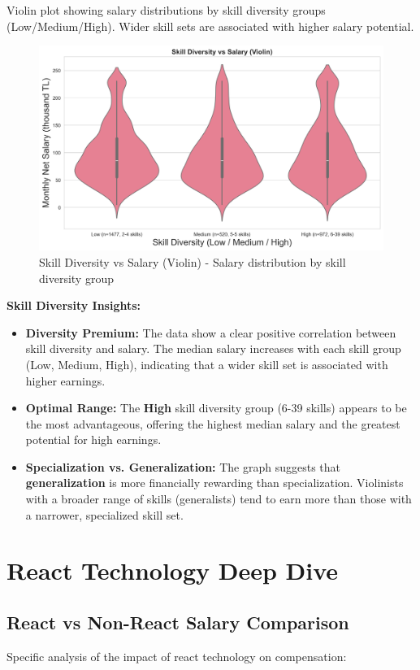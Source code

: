 \documentclass[12pt,a4paper]{article}
\begin{document}
Violin plot showing salary distributions by skill diversity groups (Low/Medium/High). Wider skill sets are associated with higher salary potential.

\begin{figure}[H]
    \centering
    \includegraphics[width=\textwidth]{figures/violin_skill_diversity.png}
    \caption{Skill Diversity vs Salary (Violin) - Salary distribution by skill diversity group}
\end{figure}

\textbf{Skill Diversity Insights:}
\begin{itemize}
    \item \textbf{Diversity Premium:}
The data show a clear positive correlation between skill diversity and salary. The median salary increases with each skill group (Low, Medium, High), indicating that a wider skill set is associated with higher earnings.
    \item \textbf{Optimal Range:}
    The \textbf{High} skill diversity group (6-39 skills) appears to be the most advantageous, offering the highest median salary and the greatest potential for high earnings.
    \item \textbf{Specialization vs. Generalization:}
The graph suggests that \textbf{ generalization} is more financially rewarding than specialization. Violinists with a broader range of skills (generalists) tend to earn more than those with a narrower, specialized skill set.
\end{itemize}

\section{React Technology Deep Dive}

\subsection{React vs Non-React Salary Comparison}
Specific analysis of the impact of react technology on compensation:
\end{document}
